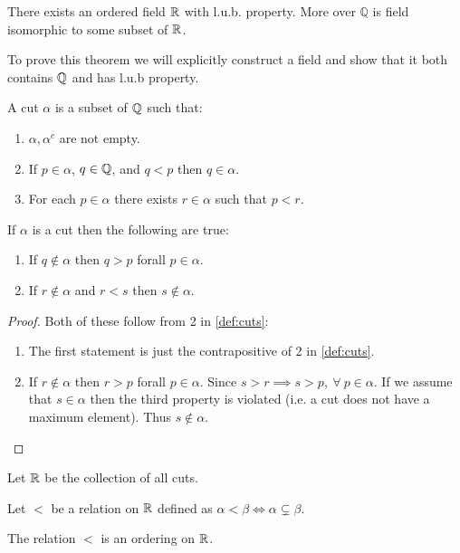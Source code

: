 \begin{theorem}\label{thm:R}
  There exists an ordered field $\mathbb{R}$ with l.u.b. property. More over $ \mathbb{Q}$ is field isomorphic to some subset of $\mathbb{R}$.
\end{theorem}
To prove this theorem we will explicitly construct a field and show that it both contains $\mathbb{Q}$ and has l.u.b property.
\begin{definition}\label{def:cuts}
  A cut $\alpha$ is a subset of $\mathbb{Q}$ such that:
  \begin{enumerate}
    \item $\alpha, \alpha^c$ are not empty.
    \item If $p\in \alpha$, $q\in \mathbb{Q}$, and $q<p$ then $q\in \alpha$.
    \item For each $p\in \alpha$ there exists $r\in \alpha$ such that $p<r$.
  \end{enumerate}
\end{definition}
\begin{proposition}\label{pro:cuts}
  If $\alpha$ is a cut then the following are true:
  \begin{enumerate}
    \item If $q\notin \alpha$ then $q>p$ forall $p\in \alpha$.
    \item If $r\notin \alpha$ and $r<s$ then $s\notin \alpha$.
  \end{enumerate}
\end{proposition}
\begin{proof}
  Both of these follow from 2 in \cref{def:cuts}:
  \begin{enumerate}
    \item The first statement is just the contrapositive of 2 in \cref{def:cuts}.
    \item If $r\notin \alpha$ then $r>p$ forall $p\in \alpha$. Since $s>r \implies s>p,\ \forall\ p\in \alpha$. If we assume that $s\in \alpha$ then the third property is violated (i.e. a cut does not have a maximum element). Thus $s\notin \alpha$.
  \end{enumerate}
\end{proof}
\begin{definition}
  Let $\mathbb{R}$ be the collection of all cuts.
\end{definition}
\begin{definition}
  Let $<$ be a relation on $\mathbb{R}$ defined as $\alpha<\beta \iff \alpha \subsetneq \beta$.
\end{definition}
\begin{proposition}
  The relation $<$ is an ordering on $\mathbb{R}$.
\end{proposition}
